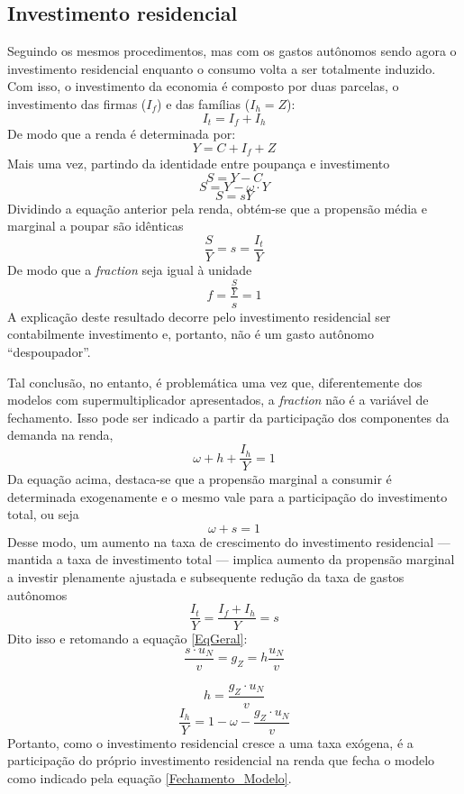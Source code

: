 \subsection{Investimento residencial}

Seguindo os mesmos procedimentos, mas com os gastos autônomos sendo agora o investimento residencial enquanto o consumo volta a ser totalmente induzido. Com isso, o investimento da economia é composto por duas parcelas, o investimento das firmas ($I_f$) e das famílias ($I_h = Z$):
$$
I_t = I_f + I_h
$$
De modo que a renda é determinada por:
$$
Y = C + I_f + Z
$$
Mais uma vez, partindo da identidade entre poupança e investimento
$$
S = Y - C
$$
$$
S = Y -  \omega\cdot Y
$$
$$
S = sY
$$
Dividindo a equação anterior pela renda, obtém-se que a propensão média e marginal a poupar são idênticas
$$
\frac{S}{Y} = s = \frac{I_t}{Y}
$$
De modo que a \textit{fraction} seja igual à unidade
$$
f = \frac{\frac{S}{Y}}{s} = 1
$$
A explicação deste resultado decorre pelo investimento residencial ser contabilmente investimento e, portanto, não é um gasto autônomo ``despoupador''. 

Tal conclusão, no entanto, é problemática uma vez que, diferentemente dos modelos com supermultiplicador apresentados, a \textit{fraction} não é a variável de fechamento. Isso pode ser indicado a partir da participação dos componentes da demanda na renda,
$$
\omega + h + \frac{I_h}{Y} = 1
$$
Da equação acima, destaca-se que a propensão marginal a consumir é determinada exogenamente e o mesmo vale para a participação do investimento total, ou seja
$$
 \omega +  s = 1
$$
Desse modo, um aumento na taxa de crescimento do investimento residencial --- mantida a taxa de investimento total --- implica aumento da propensão marginal a investir plenamente ajustada e subsequente redução da taxa de gastos autônomos
$$
\frac{I_t}{Y} = \frac{I_f + I_h}{Y} = s
$$
Dito isso e retomando a equação \ref{EqGeral}:
$$
\frac{ s\cdot  u_N}{v} =  g_Z = h\frac{ u_N}{ v}
$$

\begin{equation}
h = \frac{ g_Z\cdot  u_N}{ v}
\end{equation}
\begin{equation}
    \label{Fechamento_Modelo}
\frac{I_h}{Y} = 1 - \omega - \frac{ g_Z\cdot  u_N}{ v}
\end{equation}
Portanto, como o investimento residencial cresce a uma taxa exógena, é a participação do próprio investimento residencial na renda que fecha o modelo como indicado pela equação \ref{Fechamento_Modelo}. 

